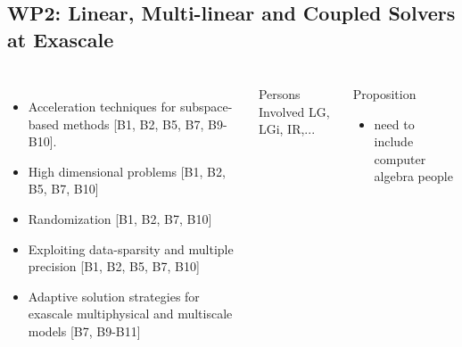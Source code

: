 \subsection{WP2: Linear, Multi-linear and Coupled Solvers at Exascale}
\begin{frame}
  \frametitle{\insertsectionhead}
  \framesubtitle{\insertsubsectionhead}
  \begin{columns}
    \begin{itemize}
      \item Acceleration techniques for subspace-based methods [B1, B2, B5, B7, B9-B10].
      \item High dimensional problems [B1, B2, B5, B7, B10] 
      \item Randomization [B1, B2, B7, B10]
      \item Exploiting data-sparsity and multiple precision [B1, B2, B5, B7, B10]
      \item Adaptive solution strategies for exascale multiphysical and multiscale models [B7, B9-B11] 
    \end{itemize}
    \begin{alertblock}{Persons Involved}
      LG, LGi, IR,...  
    \end{alertblock}
    \begin{alertblock}{Proposition}
    \begin{itemize}
      \item need to include computer algebra people
      \end{itemize}
  \end{alertblock}
  \end{columns}

\end{frame}


